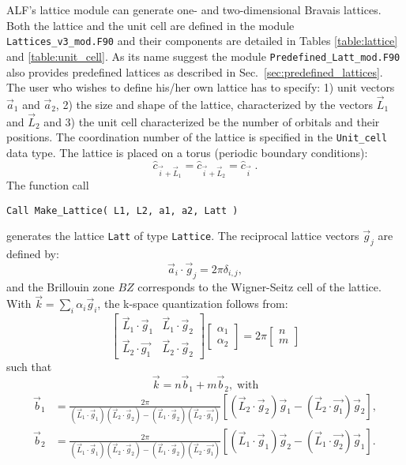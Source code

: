 ALF's lattice module can generate one- and two-dimensional Bravais lattices.
Both the lattice and the unit cell are defined in the module \texttt{Lattices\_v3\_mod.F90} and their components are detailed in Tables \ref{table:lattice} and \ref{table:unit_cell}. 
As  its name suggest the module  \texttt{Predefined\_Latt\_mod.F90} also provides predefined lattices as  described in Sec.~\ref{sec:predefined_lattices}.
The user who wishes to define his/her own lattice has to specify: 1) unit vectors $\vec{a}_1$ and $\vec{a}_2$, 2) the size and shape of the lattice, characterized by the vectors $\vec{L}_1$ and $\vec{L}_2$ and 3) the  unit cell characterized be the number of orbitals and their positions.  The coordination number of the lattice is specified in the \texttt{Unit\_cell} data type.   The lattice is placed on a torus (periodic boundary conditions):
\begin{equation}
	\hat{c}_{\vec{i} + \vec{L}_1 }  =  \hat{c}_{\vec{i} + \vec{L}_2 }  = \hat{c}_{\vec{i}}\;.
\end{equation}
The function call 
\begin{lstlisting}[style=fortran]
Call Make_Lattice( L1, L2, a1, a2, Latt )
\end{lstlisting}
generates the lattice \texttt{Latt} of type \texttt{Lattice}.   The reciprocal lattice vectors $\vec{g}_j$ are defined by:
\begin{equation}
\label{Latt.G.eq}
	\vec{a}_i  \cdot \vec{g}_j = 2 \pi \delta_{i,j}, 
\end{equation}
and the Brillouin zone $BZ$ corresponds to the Wigner-Seitz cell of the lattice. 
With $\vec{k} = \sum_{i} \alpha_i  \vec{g}_i $, the  k-space quantization follows from: 
\begin{equation}
\begin{bmatrix}
	\vec{L}_1 \cdot \vec{g}_1  &  \vec{L}_1 \cdot \vec{g}_2  \\
	\vec{L}_2  \cdot \vec{g_1} & \vec{L}_2 \cdot  \vec{g}_2  
\end{bmatrix}
\begin{bmatrix}
   \alpha_1 \\
   \alpha_2
\end{bmatrix}
=  2 \pi 
\begin{bmatrix}
   n \\
   m
\end{bmatrix}
\end{equation}
such that 
\begin{equation}
\vec{k} =  n \vec{b}_1  + m \vec{b}_2,\; \text{with}
\end{equation}
\begin{align} \label{k.quant.eq}
\vec{b}_1 &= \frac{2 \pi}{ (\vec{L}_1 \cdot \vec{g}_1)  (\vec{L}_2 \cdot  \vec{g}_2 )  - (\vec{L}_1 \cdot \vec{g}_2) (\vec{L}_2  \cdot \vec{g_1} ) }   \left[  (\vec{L}_2 \cdot  \vec{g}_2) \vec{g}_1 -   (\vec{L}_2  \cdot \vec{g_1} ) \vec{g}_2 \right], \nonumber \\ 
\vec{b}_2 &= \frac{2 \pi}{ (\vec{L}_1 \cdot \vec{g}_1)  (\vec{L}_2 \cdot  \vec{g}_2 )  - (\vec{L}_1 \cdot \vec{g}_2) (\vec{L}_2  \cdot \vec{g_1} ) }   
\left[  (\vec{L}_1 \cdot  \vec{g}_1) \vec{g}_2 -   (\vec{L}_1  \cdot \vec{g_2} ) \vec{g}_1 \right].
\end{align}

